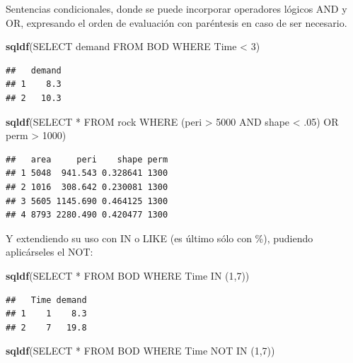 \documentclass[
]{book}
\newenvironment{Shaded}{\begin{snugshade}}{\end{snugshade}}
\newcommand{\FunctionTok}[1]{\textcolor[rgb]{0.13,0.29,0.53}{\textbf{#1}}}
\newcommand{\NormalTok}[1]{#1}
\newcommand{\StringTok}[1]{\textcolor[rgb]{0.31,0.60,0.02}{#1}}
\theoremstyle{break}
\theoremstyle{nonumberplain}
\begin{document}
Sentencias condicionales, donde se puede incorporar operadores lógicos AND y OR, expresando el orden de evaluación con paréntesis en caso de ser necesario.

\begin{Shaded}
\begin{Highlighting}[]
\FunctionTok{sqldf}\NormalTok{(}\StringTok{\textquotesingle{}SELECT demand FROM BOD WHERE Time \textless{} 3\textquotesingle{}}\NormalTok{)}
\end{Highlighting}
\end{Shaded}

\begin{verbatim}
##   demand
## 1    8.3
## 2   10.3
\end{verbatim}

\begin{Shaded}
\begin{Highlighting}[]
\FunctionTok{sqldf}\NormalTok{(}\StringTok{\textquotesingle{}SELECT * FROM rock WHERE (peri \textgreater{} 5000 AND shape \textless{} .05) OR perm \textgreater{} 1000\textquotesingle{}}\NormalTok{)}
\end{Highlighting}
\end{Shaded}

\begin{verbatim}
##   area     peri    shape perm
## 1 5048  941.543 0.328641 1300
## 2 1016  308.642 0.230081 1300
## 3 5605 1145.690 0.464125 1300
## 4 8793 2280.490 0.420477 1300
\end{verbatim}

Y extendiendo su uso con IN o LIKE (es último sólo con \%), pudiendo aplicárseles el NOT:

\begin{Shaded}
\begin{Highlighting}[]
\FunctionTok{sqldf}\NormalTok{(}\StringTok{\textquotesingle{}SELECT * FROM BOD WHERE Time IN (1,7)\textquotesingle{}}\NormalTok{)}
\end{Highlighting}
\end{Shaded}

\begin{verbatim}
##   Time demand
## 1    1    8.3
## 2    7   19.8
\end{verbatim}

\begin{Shaded}
\begin{Highlighting}[]
\FunctionTok{sqldf}\NormalTok{(}\StringTok{\textquotesingle{}SELECT * FROM BOD WHERE Time NOT IN (1,7)\textquotesingle{}}\NormalTok{)}
\end{Highlighting}
\end{Shaded}
\end{document}
